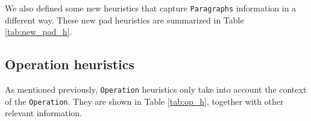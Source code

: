     We also defined some new heuristics that capture \texttt{Paragraphs} information in a different way. These new pad heuristics are summarized in Table \ref{tab:new_pad_h}.
      \begin{table}[pth!]
        \caption{New Pad heuristics (not normalized). Column \textit{Wnd} (Window) indicates whether they can be computed ignoring Operations before a given timestamp.}
        \label{tab:new_pad_h}
        \centering
      \end{table}
    
  \subsection{Operation heuristics}
    \label{sub:operation_heuristics}
    As mentioned previously,  \texttt{Operation} heuristics only take into account the context of the \texttt{Operation}. They are shown in Table \ref{tab:op_h}, together with other relevant information.

